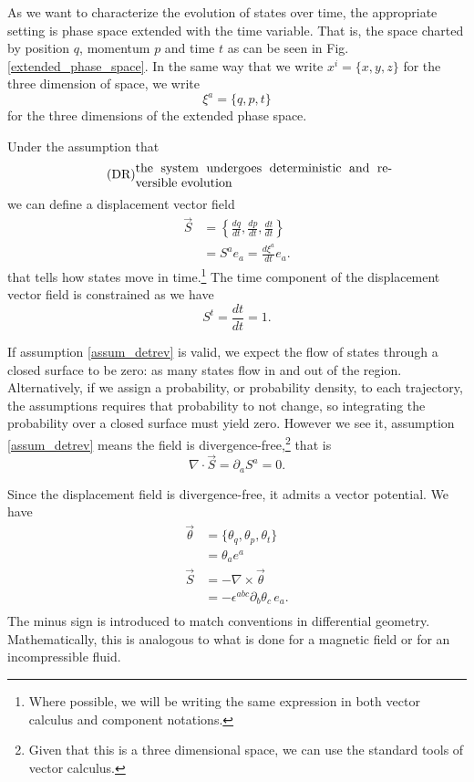 \documentclass[10pt,twocolumn, nofootinbib]{revtex4-2}
\begin{document}
As we want to characterize the evolution of states over time, the appropriate setting is phase space extended with the time variable. That is, the space charted by position $q$, momentum $p$ and time $t$ as can be seen in Fig. \ref{extended_phase_space}. In the same way that we write $x^i = \{ x, y, z \}$ for the three dimension of space, we write
\begin{equation}\label{sdof_variables}
	\xi^a = \{ q, p, t\}
\end{equation}
for the three dimensions of the extended phase space.

Under the assumption that
\begin{align}\label{assum_detrev}
	\tag*{(DR)}
	\parbox{2.8in}{the system undergoes deterministic and reversible evolution}
\end{align}
we can define a displacement vector field
\begin{equation}\label{sdof_displacement}
\begin{aligned}
	\vec{S} &= \left\{ \frac{dq}{dt},\frac{dp}{dt},\frac{dt}{dt} \right\} \\
	&= S^a e_a = \frac{d\xi^a}{dt} e_a .
\end{aligned}
\end{equation}
that tells how states move in time.\footnote{Where possible, we will be writing the same expression in both vector calculus and component notations.} The time component of the displacement vector field is constrained as we have
\begin{equation}\label{sdof_time_constraint}
	S^t=\frac{dt}{dt}=1.
\end{equation}

If assumption \ref{assum_detrev} is valid, we expect the flow of states through a closed surface to be zero: as many states flow in and out of the region. Alternatively, if we assign a probability, or probability density, to each trajectory, the assumptions requires that probability to not change, so integrating the probability over a closed surface must yield zero. However we see it, assumption \ref{assum_detrev} means the field is divergence-free,\footnote{Given that this is a three dimensional space, we can use the standard tools of vector calculus.} that is
\begin{equation}\label{sdof_div_free}
	\nabla \cdot \vec{S} = \partial_a S^a = 0.
\end{equation}

Since the displacement field is divergence-free, it admits a vector potential. We have
\begin{equation}\label{sdof_displacement_potential}
\begin{aligned}
	\vec{\theta} &= \{\theta_q, \theta_p, \theta_t\} \\
	&= \theta_a e^a \\
	\vec{S} &= - \nabla \times \vec{\theta} \\
	&= - \epsilon^{abc} \partial_b \theta_c \, e_a. \\
\end{aligned}
\end{equation}
The minus sign is introduced to match conventions in differential geometry. Mathematically, this is analogous to what is done for a magnetic field or for an incompressible fluid.
\end{document}
